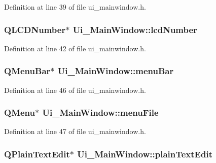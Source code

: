 Definition at line 39 of file ui\-\_\-mainwindow.\-h.

\hypertarget{class_ui___main_window_aeaa664b636e02543a3047acb6d8918c5}{
\subsubsection[{lcd\-Number}]{\setlength{\rightskip}{0pt plus 5cm}Q\-L\-C\-D\-Number$\ast$ Ui\-\_\-\-Main\-Window\-::lcd\-Number}}\label{class_ui___main_window_aeaa664b636e02543a3047acb6d8918c5}


Definition at line 42 of file ui\-\_\-mainwindow.\-h.

\hypertarget{class_ui___main_window_a2be1c24ec9adfca18e1dcc951931457f}{
\subsubsection[{menu\-Bar}]{\setlength{\rightskip}{0pt plus 5cm}Q\-Menu\-Bar$\ast$ Ui\-\_\-\-Main\-Window\-::menu\-Bar}}\label{class_ui___main_window_a2be1c24ec9adfca18e1dcc951931457f}


Definition at line 46 of file ui\-\_\-mainwindow.\-h.

\hypertarget{class_ui___main_window_a7ba84cb4cdd6a12dc83bf4e100bd8d80}{
\subsubsection[{menu\-File}]{\setlength{\rightskip}{0pt plus 5cm}Q\-Menu$\ast$ Ui\-\_\-\-Main\-Window\-::menu\-File}}\label{class_ui___main_window_a7ba84cb4cdd6a12dc83bf4e100bd8d80}


Definition at line 47 of file ui\-\_\-mainwindow.\-h.

\hypertarget{class_ui___main_window_a6e290c2eca03b98b6f379c71910c0ed6}{
\subsubsection[{plain\-Text\-Edit}]{\setlength{\rightskip}{0pt plus 5cm}Q\-Plain\-Text\-Edit$\ast$ Ui\-\_\-\-Main\-Window\-::plain\-Text\-Edit}}\label{class_ui___main_window_a6e290c2eca03b98b6f379c71910c0ed6}



